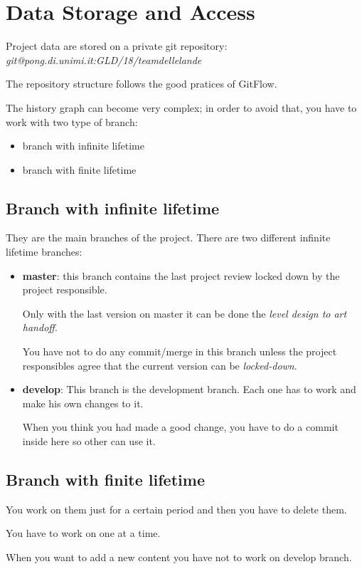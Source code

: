 \documentclass[12pt]{article}
\begin{document}
\section{Data Storage and Access}
Project data are stored on a private git repository:\\
	\textit{git@pong.di.unimi.it:GLD/18/teamdellelande}

The repository structure follows the good pratices of GitFlow.

The history graph can become very complex; in order to avoid that, you have to work with two type of branch:
\begin{itemize}
	\item branch with infinite lifetime
	\item branch with finite lifetime
\end{itemize}

\subsection{Branch with infinite lifetime}
They are the main branches of the project. There are two different infinite lifetime branches:
\begin{itemize}
\item \textbf{master}: this branch contains the last project review locked down by the project responsible.
    
  Only with the last version on master it can be done the \textit{level design to art handoff}.
  
  You have not to do any commit/merge in this branch unless the project responsibles agree that the current version can be \textit{locked-down}.
  
\item \textbf{develop}: This branch is the development branch. Each one has to work and make his own changes to it.
  
  When you think you had made a good change, you have to do a commit inside here so other can use it.
\end{itemize}

\subsection{Branch with finite lifetime}
You work on them just for a certain period and then you have to delete them.

You have to work on one at a time.

When you want to add a new content you have not to work on develop branch.
\end{document}
